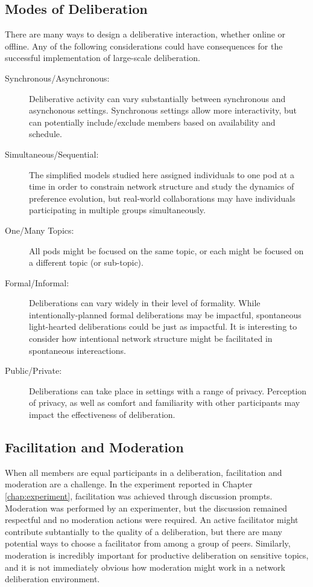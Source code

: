 \subsection{Modes of Deliberation}
There are many ways to design a deliberative interaction, whether online or offline. Any of the following considerations could have consequences for the successful implementation of large-scale deliberation.
\begin{description}
	\item[Synchronous/Asynchronous:] Deliberative activity can vary substantially between synchronous and asynchonous settings. Synchronous settings allow more interactivity, but can potentially include/exclude members based on availability and schedule.
	\item[Simultaneous/Sequential:] The simplified models studied here assigned individuals to one pod at a time in order to constrain network structure and study the dynamics of preference evolution, but real-world collaborations may have individuals participating in multiple groups simultaneously.
	\item[One/Many Topics:] All pods might be focused on the same topic, or each might be focused on a different topic (or sub-topic).
	\item[Formal/Informal:] Deliberations can vary widely in their level of formality. While intentionally-planned formal deliberations may be impactful, spontaneous light-hearted deliberations could be just as impactful. It is interesting to consider how intentional network structure might be facilitated in spontaneous intereactions.
	\item[Public/Private:] Deliberations can take place in settings with a range of privacy. Perception of privacy, as well as comfort and familiarity with other participants may impact the effectiveness of deliberation.
\end{description}

\subsection{Facilitation and Moderation}
When all members are equal participants in a deliberation, facilitation and moderation are a challenge.
In the experiment reported in Chapter \ref{chap:experiment}, facilitation was achieved through discussion prompts.
Moderation was performed by an experimenter, but the discussion remained respectful and no moderation actions were required.
An active facilitator might contribute subtantially to the quality of a deliberation, but there are many potential ways to choose a facilitator from among a group of peers.
Similarly, moderation is incredibly important for productive deliberation on sensitive topics, and it is not immediately obvious how moderation might work in a network deliberation environment.


